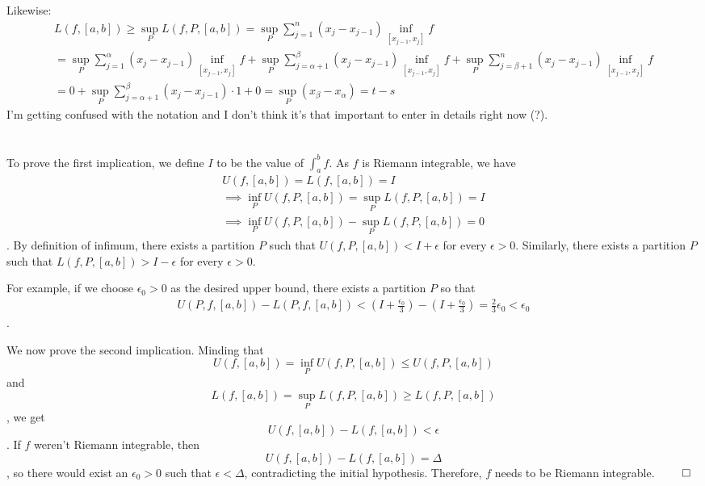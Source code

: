 \documentclass[11pt, a4paper, tikz]{article}
\newcommand{\centsection}[1]{
	\section*{\centering{#1}}
}
\begin{document}
	Likewise:
	\begin{align*}
		L(f, [a,b]) \geq \sup_PL(f, P, [a,b]) = \sup_P\sum_{j=1}^n(x_j-x_{j-1})\inf_{[x_{j-1},x_j]}f\\	=\sup_P\sum_{j=1}^\alpha(x_j-x_{j-1})\inf_{[x_{j-1},x_j]}f+\sup_P\sum_{j=\alpha+1}^\beta(x_j-x_{j-1})\inf_{[x_{j-1},x_j]}f+\sup_P\sum_{j=\beta+1}^n(x_j-x_{j-1})\inf_{[x_{j-1},x_j]}f\\
		=0+\sup_P\sum_{j=\alpha+1}^\beta(x_j-x_{j-1})\cdot1+0=\sup_P(x_\beta-x_\alpha)=t-s
	\end{align*}
	I'm getting confused with the notation and I don't think it's that important to enter in details right now (?).
	
	\centsection{Exercise 3}
	
	To prove the first implication, we define $I$ to be the value of $\int_{a}^{b}f$. As $f$ is Riemann integrable, we have \begin{align*}
		U(f,[a,b])=L(f,[a,b])=I\\
		\implies\inf_PU(f,P,[a,b])=\sup_PL(f,P,[a,b])=I\\ \implies\inf_PU(f,P,[a,b])-\sup_PL(f,P,[a,b])=0
	\end{align*}.
	By definition of infimum, there exists a partition $P$ such that $U(f,P,[a,b])< I+\epsilon$ for every $\epsilon>0$. Similarly, there exists a partition $P$ such that $L(f,P,[a,b])>I-\epsilon$ for every $\epsilon>0$.
	
	For example, if we choose $\epsilon_0>0$ as the desired upper bound, there exists a partition $P$ so that
	\begin{align*}
		U(P,f,[a,b])-L(P,f,[a,b])<(I+\frac{\epsilon_0}{3})-(I+\frac{\epsilon_0}{3})=\frac{2}{3}\epsilon_0 < \epsilon_0
	\end{align*}.
	
	We now prove the second implication. Minding that \[U(f,[a,b])=\inf_PU(f,P,[a,b])\leq U(f,P,[a,b])\] and \[L(f,[a,b])=\sup_PL(f,P,[a,b])\geq L(f,P,[a,b])\], we get \[U(f,[a,b])-L(f,[a,b])<\epsilon\]. If $f$ weren't Riemann integrable, then \[U(f,[a,b])-L(f,[a,b])=\Delta\], so there would exist an $\epsilon_0>0$ such that $\epsilon<\Delta$, contradicting the initial hypothesis. Therefore, $f$ needs to be Riemann integrable.
	$\qed$
\end{document}
